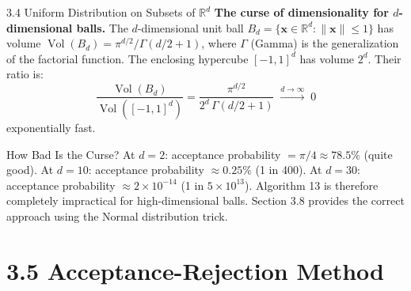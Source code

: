 \documentclass[aspectratio=169,10pt]{beamer}
\newcommand{\RR}{\mathbb{R}}
\DeclareMathOperator{\Vol}{Vol}
\begin{document}
\begin{frame}[allowframebreaks]{3.4 Uniform Distribution on Subsets of $\RR^d$}
\textbf{The curse of dimensionality for $d$-dimensional balls.}
The $d$-dimensional unit ball $B_d = \{\mathbf{x} \in \RR^d : \|\mathbf{x}\| \le 1\}$
has volume $\Vol(B_d) = \pi^{d/2}/\Gamma(d/2+1)$, where $\Gamma$ (Gamma) is
the generalization of the factorial function.  The enclosing hypercube
$[-1,1]^d$ has volume $2^d$.  Their ratio is:
\[
  \frac{\Vol(B_d)}{\Vol([-1,1]^d)} = \frac{\pi^{d/2}}{2^d\,\Gamma(d/2+1)}
  \;\xrightarrow{d \to \infty}\; 0
\]
exponentially fast.

\begin{alertblock}{How Bad Is the Curse?}
  At $d = 2$: acceptance probability $= \pi/4 \approx 78.5\%$ (quite good).
  At $d = 10$: acceptance probability $\approx 0.25\%$ (1 in 400).
  At $d = 30$: acceptance probability $\approx 2 \times 10^{-14}$ (1 in $5 \times 10^{13}$).
  Algorithm 13 is therefore completely impractical for high-dimensional balls.
  Section 3.8 provides the correct approach using the Normal distribution trick.
\end{alertblock}

\end{frame}

\section{3.5 Acceptance-Rejection Method}
\end{document}
